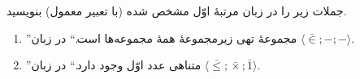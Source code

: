 جملات زیر را در زبان مرتبهٔ اوّل مشخص شده (با تعبیر معمول) بنویسید.
  \begin{enumerate}[label=(\alph*)]
    \item ''مجموعهٔ تهی زیرمجموعهٔ همهٔ مجموعه‌ها است.`` در زبان $\langle \bar{\in}; - ; -\rangle$.
    \item ''متناهی عدد اوّل وجود دارد.`` در زبان $\langle \bar{\leq} ; \bar{\times} ; \bar{1} \rangle$.
  \end{enumerate}